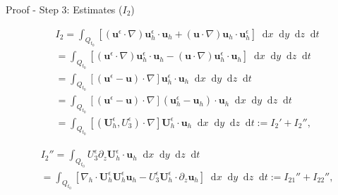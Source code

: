 \documentclass{beamer}
\newcommand*\diff{\mathop{}\!\mathrm{d}}
\begin{document}
\begin{frame}{Proof - Step 3: Estimates ($I_2$)}

\changefontsizes{10pt}

  \begin{equation}\nonumber
    \begin{split}
      & I_2 = \int_{Q_{t_0}} [(\mathbf{u}^\epsilon \cdot \nabla) \mathbf{u}_h^\epsilon \cdot \mathbf{u}_h + (\mathbf{u} \cdot \nabla )\mathbf{u}_h \cdot \mathbf{u}_h^\epsilon] \diff x \diff y \diff z \diff t \\
      & = \int_{Q_{t_0}} [(\mathbf{u}^\epsilon \cdot \nabla) \mathbf{u}_h^\epsilon \cdot \mathbf{u}_h - (\mathbf{u} \cdot \nabla )\mathbf{u}^\epsilon_h \cdot \mathbf{u}_h] \diff x \diff y \diff z \diff t \\
      & = \int_{Q_{t_0}} [(\mathbf{u}^\epsilon - \mathbf{u}) \cdot \nabla ] \mathbf{u}_h^\epsilon \cdot \mathbf{u}_h  \diff x \diff y \diff z \diff t \\
      & = \int_{Q_{t_0}} [(\mathbf{u}^\epsilon - \mathbf{u}) \cdot \nabla ] (\mathbf{u}_h^\epsilon - \mathbf{u}_h) \cdot \mathbf{u}_h  \diff x \diff y \diff z \diff t \\
      & = \int_{Q_{t_0}} [(\mathbf{U}_h^\epsilon, U^\epsilon_3) \cdot \nabla ] \mathbf{U}_h^\epsilon \cdot \mathbf{u}_h  \diff x \diff y \diff z \diff t := I_2' + I_2'',
    \end{split}
  \end{equation}
  
    \begin{equation}\nonumber
    \begin{split}
      & I_2 '' = \int_{Q_{t_0}} U^\epsilon_3 \partial_z \mathbf{U}_h^\epsilon \cdot \mathbf{u}_h \diff x \diff y \diff z \diff t \\
      & =  \int_{Q_{t_0}} [\nabla_h \cdot \mathbf{U}_h^\epsilon \mathbf{U}_h^\epsilon \mathbf{u}_h - U^\epsilon_3 \mathbf{U}_h^\epsilon \cdot \partial_z \mathbf{u}_h ] \diff x \diff y \diff z \diff t := I_{21}'' + I_{22}'',
    \end{split}
  \end{equation}
  
\end{frame}
\end{document}
